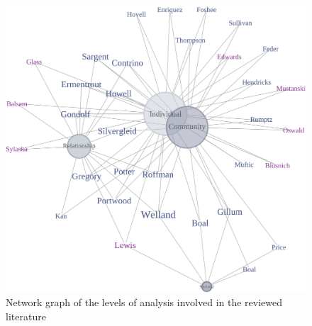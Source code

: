 \documentclass[11pt,]{tufte-book}
\begin{document}
\newpage

\begin{figure}
\centering
\includegraphics{graphics/inputs/keysnet.png}
\caption{Network graph of the levels of analysis involved in the
reviewed literature\label{fig:keysnet}}
\end{figure}

\newpage
\end{document}
